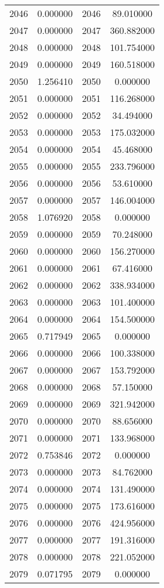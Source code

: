 \documentclass[12pt]{article}
\begin{document}
\begin{longtable}{@{}cccc@{}}
2046 & 0.000000 & 2046 & 89.010000 \\
2047 & 0.000000 & 2047 & 360.882000 \\
2048 & 0.000000 & 2048 & 101.754000 \\
2049 & 0.000000 & 2049 & 160.518000 \\
2050 & 1.256410 & 2050 & 0.000000 \\
2051 & 0.000000 & 2051 & 116.268000 \\
2052 & 0.000000 & 2052 & 34.494000 \\
2053 & 0.000000 & 2053 & 175.032000 \\
2054 & 0.000000 & 2054 & 45.468000 \\
2055 & 0.000000 & 2055 & 233.796000 \\
2056 & 0.000000 & 2056 & 53.610000 \\
2057 & 0.000000 & 2057 & 146.004000 \\
2058 & 1.076920 & 2058 & 0.000000 \\
2059 & 0.000000 & 2059 & 70.248000 \\
2060 & 0.000000 & 2060 & 156.270000 \\
2061 & 0.000000 & 2061 & 67.416000 \\
2062 & 0.000000 & 2062 & 338.934000 \\
2063 & 0.000000 & 2063 & 101.400000 \\
2064 & 0.000000 & 2064 & 154.500000 \\
2065 & 0.717949 & 2065 & 0.000000 \\
2066 & 0.000000 & 2066 & 100.338000 \\
2067 & 0.000000 & 2067 & 153.792000 \\
2068 & 0.000000 & 2068 & 57.150000 \\
2069 & 0.000000 & 2069 & 321.942000 \\
2070 & 0.000000 & 2070 & 88.656000 \\
2071 & 0.000000 & 2071 & 133.968000 \\
2072 & 0.753846 & 2072 & 0.000000 \\
2073 & 0.000000 & 2073 & 84.762000 \\
2074 & 0.000000 & 2074 & 131.490000 \\
2075 & 0.000000 & 2075 & 173.616000 \\
2076 & 0.000000 & 2076 & 424.956000 \\
2077 & 0.000000 & 2077 & 191.316000 \\
2078 & 0.000000 & 2078 & 221.052000 \\
2079 & 0.071795 & 2079 & 0.000000 \\

\end{longtable}
\end{document}
